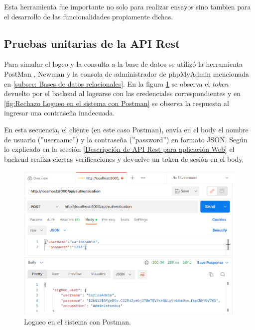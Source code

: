 Esta herramienta fue importante no solo para realizar ensayos sino tambien para el desarrollo de las funcionalidades propiamente dichas.

\pagebreak

\subsection{Pruebas unitarias de la API Rest}

Para simular el logeo y la consulta a la base de datos se utilizó la herramienta PostMan \citep{WEBSITE:30}, Newman \citep{WEBSITE:35} y la consola de administrador de phpMyAdmin mencionada en \ref{subsec: Bases de datos relacionales}. En la figura \ref{fig:Logueo en el sistema con Postman} se observa el \textit{token} devuelto por el backend al logearse con las credenciales correspondientes y en \ref{fig:Rechazo Logueo en el sistema con Postman} se observa la respuesta al ingresar una contraseña inadecuada.


En esta secuencia, el cliente (en este caso Postman), envía en el body el nombre de usuario (''username'') y la contraseña (''password'') en formato JSON. Según lo explicado en la sección  \ref{Descripción de API Rest para aplicación Web} el backend realiza ciertas verificaciones y devuelve un token de sesión en el body.

\begin{figure}[ht]
	\centering
	\includegraphics[scale=.35]{./Figures/auth.png}
	\caption{Logueo en el sistema con Postman.}
	\label{fig:Logueo en el sistema con Postman}
\end{figure}

